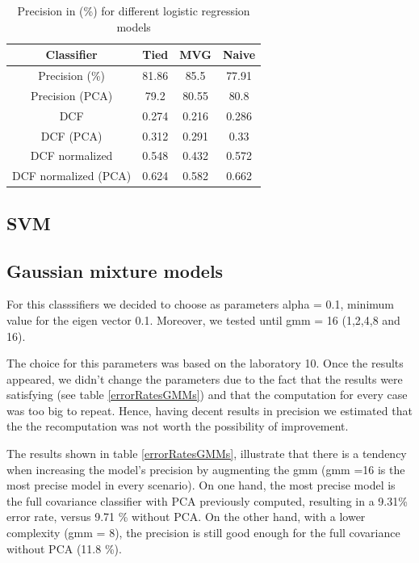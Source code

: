 \documentclass[twoside,a4paper,12pt]{report}
\begin{document}
\begin{table}[H]
    \centering
     \begin{tabular}{||c c c c||} 
        \hline \hline
        Classifier & Tied & MVG  & Naive \\
        \hline\hline
        Precision (\%) &  81.86 & \cellcolor{blue!25}  85.5 & 77.91  \\ 
        \hline
        Precision (PCA)  &  79.2 &  80.55 & 80.8 \\ 
        \hline
        DCF &  0.274 &  0.216 & 0.286  \\   
        \hline
        DCF (PCA)  &  0.312 &  0.291 & 0.33  \\   
        \hline
        DCF normalized &  0.548 &\cellcolor{blue!25}  0.432 & 0.572  \\ 
        \hline
        DCF normalized (PCA)  &  0.624 &  0.582 & 0.662    \\ 
        \hline \hline
    \end{tabular}
    
    \caption{Precision in (\%) for different logistic regression models \label{errorRatesConfusionMatrix}}
\end{table}


\subsection{SVM}

\subsection{Gaussian mixture models}
For this classsifiers we decided to choose as parameters alpha = 0.1, minimum value
for the eigen vector 0.1. Moreover, we tested until gmm = 16 (1,2,4,8 and 16).

The choice for this parameters was based on the laboratory 10. Once the results appeared,
we didn't change the parameters due to the fact that the results were satisfying (see table \ref{errorRatesGMMs})
and that the computation for every case was too big to repeat. Hence, having
decent results in precision we estimated that the the recomputation was not worth the 
possibility of improvement.

The results shown in table \ref{errorRatesGMMs}, illustrate that there is a tendency 
when increasing the model's precision by augmenting the gmm (gmm =16 is the most precise model
in every scenario). On one hand, the most precise model is the full covariance classifier with PCA previously computed,
resulting in a 9.31\% error rate, versus 9.71 \% without PCA. On the other hand, with a lower complexity (gmm = 8),
the precision is still good enough for the full covariance without PCA (11.8 \%).
\end{document}
